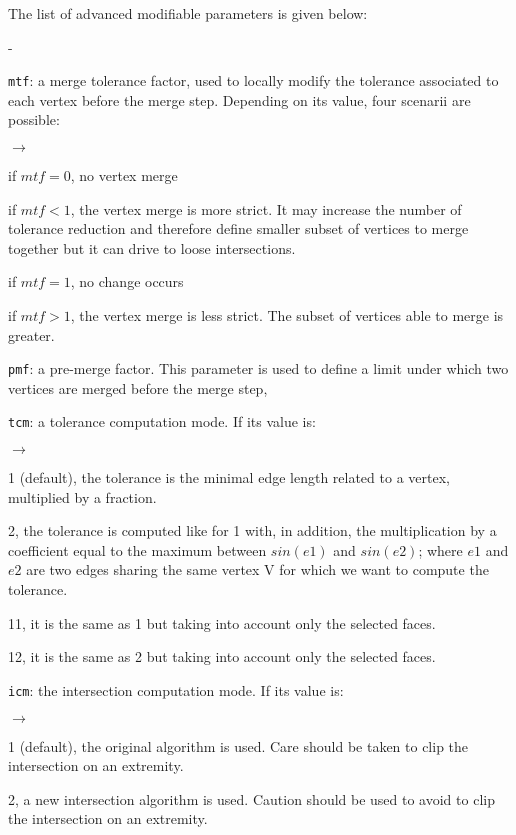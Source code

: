 {{{The list of advanced modifiable parameters is given below:
\begin{list}{-}{}
\item \texttt{mtf}: a merge tolerance factor, used to locally modify the tolerance associated to each vertex before the merge step. Depending on its value, four scenarii are possible:
\begin{list}{$\rightarrow$}{}
\item if $mtf=0$, no vertex merge
\item if $mtf<1$, the vertex merge is more strict. It may increase the number of tolerance reduction and therefore define smaller subset of vertices to merge together but it can drive to loose intersections.
\item if $mtf=1$, no change occurs
\item if $mtf>1$, the vertex merge is less strict. The subset of vertices able to merge is greater.
\end{list}
\item \texttt{pmf}: a pre-merge factor. This parameter is used to define a limit under which two vertices are merged before the merge step,
\item \texttt{tcm}: a tolerance computation mode. If its value is:
\begin{list}{$\rightarrow$}{}
\item 1 (default), the tolerance is the minimal edge length related to a vertex, multiplied by a fraction.
\item 2, the tolerance is computed like for 1 with, in addition, the multiplication by a coefficient equal to the maximum between $sin(e1)$ and $sin(e2)$; where $e1$ and $e2$ are two edges sharing the same vertex V for which we want to compute the tolerance.
\item 11, it is the same as 1 but taking into account only the selected faces.
\item 12, it is the same as 2 but taking into account only the selected faces.
\end{list}
\item \texttt{icm}: the intersection computation mode. If its value is:
\begin{list}{$\rightarrow$}{}
\item 1 (default), the original algorithm is used. Care should be taken to clip the intersection on an extremity.
\item 2, a new intersection algorithm is used. Caution should be used to avoid to clip the intersection on an extremity.
\end{list}

\end{list}}}}
